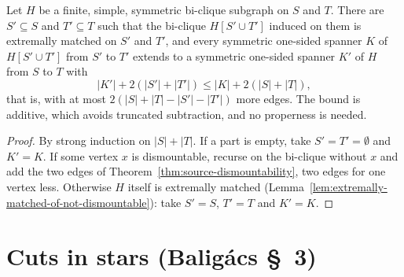 \begin{lemma}
  \label{lem:bal-dismountability}
  \leanok
  Let $H$ be a finite, simple, symmetric bi-clique subgraph on $S$ and $T$.
  There are $S' \subseteq S$ and $T' \subseteq T$ such that the bi-clique
  $H[S' \cup T']$ induced on them is extremally matched on $S'$ and $T'$, and
  every symmetric one-sided spanner $K$ of $H[S' \cup T']$ from $S'$ to $T'$
  extends to a symmetric one-sided spanner $K'$ of $H$ from $S$ to $T$ with
  \[
    |K'| + 2(|S'| + |T'|) \le |K| + 2(|S| + |T|),
  \]
  that is, with at most $2(|S| + |T| - |S'| - |T'|)$ more edges. The bound is
  additive, which avoids truncated subtraction, and no properness is needed.
\end{lemma}

\begin{proof}
  \leanok
  By strong induction on $|S| + |T|$. If a part is empty, take
  $S' = T' = \emptyset$ and $K' = K$. If some vertex $x$ is dismountable,
  recurse on the bi-clique without $x$ and add the two edges of
  Theorem~\ref{thm:source-dismountability}, two edges for one vertex less.
  Otherwise $H$ itself is extremally matched
  (Lemma~\ref{lem:extremally-matched-of-not-dismountable}): take $S' = S$,
  $T' = T$ and $K' = K$.
\end{proof}

\section*{Cuts in stars (Baligács \S~3)}

